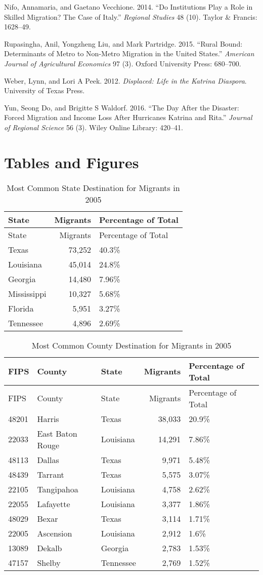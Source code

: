 \documentclass[]{article}
\begin{document}
\hypertarget{ref-nifo2014institutions}{}
Nifo, Annamaria, and Gaetano Vecchione. 2014. ``Do Institutions Play a
Role in Skilled Migration? The Case of Italy.'' \emph{Regional Studies}
48 (10). Taylor \& Francis: 1628--49.

\hypertarget{ref-rupasingha2015rural}{}
Rupasingha, Anil, Yongzheng Liu, and Mark Partridge. 2015. ``Rural
Bound: Determinants of Metro to Non-Metro Migration in the United
States.'' \emph{American Journal of Agricultural Economics} 97 (3).
Oxford University Press: 680--700.

\hypertarget{ref-weber2012displaced}{}
Weber, Lynn, and Lori A Peek. 2012. \emph{Displaced: Life in the Katrina
Diaspora}. University of Texas Press.

\hypertarget{ref-yun2016day}{}
Yun, Seong Do, and Brigitte S Waldorf. 2016. ``The Day After the
Disaster: Forced Migration and Income Loss After Hurricanes Katrina and
Rita.'' \emph{Journal of Regional Science} 56 (3). Wiley Online Library:
420--41.

\clearpage

\section{Tables and Figures}\label{tables-and-figures}

\begin{longtable}[]{@{}lrl@{}}
\caption{Most Common State Destination for Migrants in 2005
\label{tab:commondeststate}}\tabularnewline
\toprule
State & Migrants & Percentage of Total\tabularnewline
\midrule
\endfirsthead
\toprule
State & Migrants & Percentage of Total\tabularnewline
\midrule
\endhead
Texas & 73,252 & 40.3\%\tabularnewline
Louisiana & 45,014 & 24.8\%\tabularnewline
Georgia & 14,480 & 7.96\%\tabularnewline
Mississippi & 10,327 & 5.68\%\tabularnewline
Florida & 5,951 & 3.27\%\tabularnewline
Tennessee & 4,896 & 2.69\%\tabularnewline
\bottomrule
\end{longtable}

\clearpage

\begin{longtable}[]{@{}lllrl@{}}
\caption{Most Common County Destination for Migrants in 2005
\label{tab:commondest}}\tabularnewline
\toprule
FIPS & County & State & Migrants & Percentage of Total\tabularnewline
\midrule
\endfirsthead
\toprule
FIPS & County & State & Migrants & Percentage of Total\tabularnewline
\midrule
\endhead
48201 & Harris & Texas & 38,033 & 20.9\%\tabularnewline
22033 & East Baton Rouge & Louisiana & 14,291 & 7.86\%\tabularnewline
48113 & Dallas & Texas & 9,971 & 5.48\%\tabularnewline
48439 & Tarrant & Texas & 5,575 & 3.07\%\tabularnewline
22105 & Tangipahoa & Louisiana & 4,758 & 2.62\%\tabularnewline
22055 & Lafayette & Louisiana & 3,377 & 1.86\%\tabularnewline
48029 & Bexar & Texas & 3,114 & 1.71\%\tabularnewline
22005 & Ascension & Louisiana & 2,912 & 1.6\%\tabularnewline
13089 & Dekalb & Georgia & 2,783 & 1.53\%\tabularnewline
47157 & Shelby & Tennessee & 2,769 & 1.52\%\tabularnewline
\bottomrule
\end{longtable}
\end{document}
